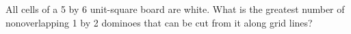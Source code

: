 All cells of a 5 by 6 unit-square board are white. What is the greatest number of nonoverlapping 1 by 2 dominoes that can be cut from it along grid lines?
